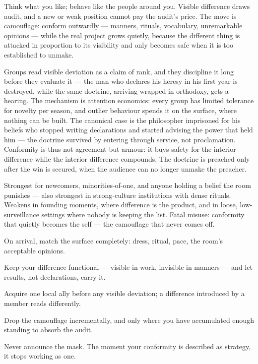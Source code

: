 \begin{core}
Think what you like; behave like the people around you. Visible difference draws audit, and a new or weak position cannot pay the audit's price. The move is camouflage: conform outwardly --- manners, rituals, vocabulary, unremarkable opinions --- while the real project grows quietly, because the different thing is attacked in proportion to its visibility and only becomes safe when it is too established to unmake.
\end{core}
\begin{mechanism}
Groups read visible deviation as a claim of rank, and they discipline it long before they evaluate it --- the man who declares his heresy in his first year is destroyed, while the same doctrine, arriving wrapped in orthodoxy, gets a hearing. The mechanism is attention economics: every group has limited tolerance for novelty per season, and outlier behaviour spends it on the surface, where nothing can be built. The canonical case is the philosopher imprisoned for his beliefs who stopped writing declarations and started advising the power that held him --- the doctrine survived by entering through service, not proclamation. Conformity is thus not agreement but armour: it buys safety for the interior difference while the interior difference compounds. The doctrine is preached only after the win is secured, when the audience can no longer unmake the preacher.
\end{mechanism}
\begin{conditions}
Strongest for newcomers, minorities-of-one, and anyone holding a belief the room punishes --- also strongest in strong-culture institutions with dense rituals. Weakens in founding moments, where difference is the product, and in loose, low-surveillance settings where nobody is keeping the list. Fatal misuse: conformity that quietly becomes the self --- the camouflage that never comes off.
\end{conditions}
\begin{application}
  \item On arrival, match the surface completely: dress, ritual, pace, the room's acceptable opinions.
  \item Keep your difference functional --- visible in work, invisible in manners --- and let results, not declarations, carry it.
  \item Acquire one local ally before any visible deviation; a difference introduced by a member reads differently.
  \item Drop the camouflage incrementally, and only where you have accumulated enough standing to absorb the audit.
  \item Never announce the mask. The moment your conformity is described as strategy, it stops working as one.
\end{application}
